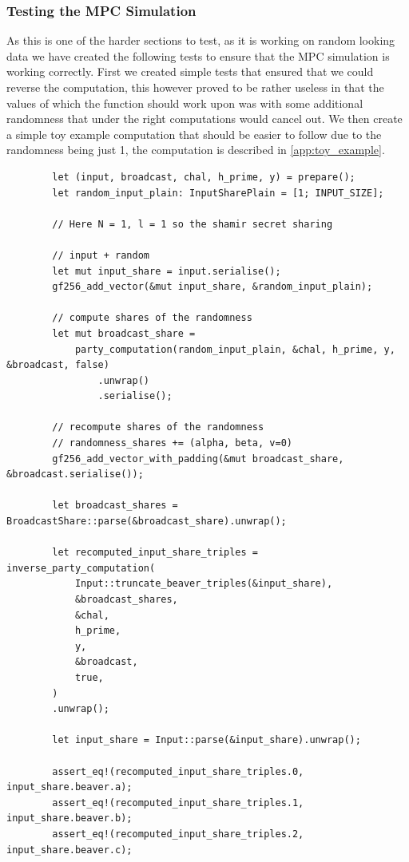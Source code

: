 \documentclass[11pt]{report}
\theoremstyle{definition}
\theoremstyle{plain}
\begin{document}
\subsubsection{Testing the MPC Simulation}
As this is one of the harder sections to test, as it is working on random looking data we have created the following tests to ensure that the MPC simulation is working correctly. 
First we created simple tests that ensured that we could reverse the computation, this however proved to be rather useless in that the values of which the function should work upon was with some additional randomness that under the right computations would cancel out. 
We then create a simple toy example computation that should be easier to follow due to the randomness being just 1, the computation is described in \autoref{app:toy_example}.
\begin{verbatim}
        let (input, broadcast, chal, h_prime, y) = prepare();
        let random_input_plain: InputSharePlain = [1; INPUT_SIZE];

        // Here N = 1, l = 1 so the shamir secret sharing

        // input + random
        let mut input_share = input.serialise();
        gf256_add_vector(&mut input_share, &random_input_plain);

        // compute shares of the randomness
        let mut broadcast_share =
            party_computation(random_input_plain, &chal, h_prime, y, &broadcast, false)
                .unwrap()
                .serialise();

        // recompute shares of the randomness
        // randomness_shares += (alpha, beta, v=0)
        gf256_add_vector_with_padding(&mut broadcast_share, &broadcast.serialise());

        let broadcast_shares = BroadcastShare::parse(&broadcast_share).unwrap();

        let recomputed_input_share_triples = inverse_party_computation(
            Input::truncate_beaver_triples(&input_share),
            &broadcast_shares,
            &chal,
            h_prime,
            y,
            &broadcast,
            true,
        )
        .unwrap();

        let input_share = Input::parse(&input_share).unwrap();

        assert_eq!(recomputed_input_share_triples.0, input_share.beaver.a);
        assert_eq!(recomputed_input_share_triples.1, input_share.beaver.b);
        assert_eq!(recomputed_input_share_triples.2, input_share.beaver.c);
\end{verbatim}
\end{document}
